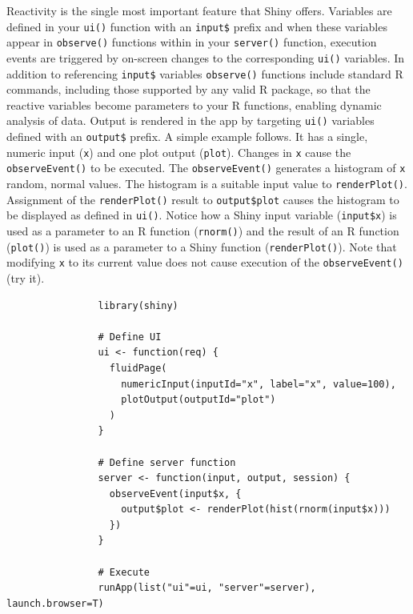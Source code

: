\documentclass[10pt, letterpaper]{article}
\begin{document}
\begin{spacing}{1.0}
Reactivity is the single most important feature that Shiny offers.  Variables are defined in your \texttt{ui()} function with an \texttt{input\$} prefix and when these variables appear in \texttt{observe()} functions within in your \texttt{server()} function, execution events are triggered by on-screen changes to the corresponding \texttt{ui()} variables.  In addition to referencing \texttt{input\$} variables \texttt{observe()} functions include standard R commands, including those supported by any valid R package, so that the reactive variables become parameters to your R functions, enabling dynamic analysis of data.  Output is rendered in the app by targeting \texttt{ui()} variables defined with an \texttt{output\$} prefix.  A simple example follows.  It has a single, numeric input (\texttt{x}) and one plot output (\texttt{plot}).  Changes in \texttt{x} cause the \texttt{observeEvent()} to be executed.  The \texttt{observeEvent()} generates a histogram of \texttt{x} random, normal values.  The histogram is a suitable input value to \texttt{renderPlot()}.  Assignment of the \texttt{renderPlot()} result to \texttt{output\$plot} causes the histogram to be displayed as defined in \texttt{ui()}.  Notice how a Shiny input variable (\texttt{input\$x}) is used as a parameter to an R function (\texttt{rnorm()}) and the result of an R function (\texttt{plot()}) is used as a parameter to a Shiny function (\texttt{renderPlot()}).  Note that modifying \texttt{x} to its current value does not cause execution of the \texttt{observeEvent()} (try it).

\vspace{0.1in}

\small
\begin{verbatim}
                library(shiny)
                
                # Define UI
                ui <- function(req) {
                  fluidPage(
                    numericInput(inputId="x", label="x", value=100),
                    plotOutput(outputId="plot")
                  )
                }
                
                # Define server function
                server <- function(input, output, session) {
                  observeEvent(input$x, {
                    output$plot <- renderPlot(hist(rnorm(input$x)))
                  })
                }
                
                # Execute
                runApp(list("ui"=ui, "server"=server), launch.browser=T)
\end{verbatim}
\normalsize


\end{spacing}
\end{document}
